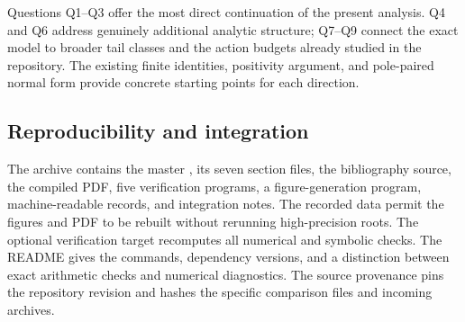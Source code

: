 Questions Q1--Q3 offer the most direct continuation of the present
analysis.  Q4 and Q6 address genuinely additional analytic structure;
Q7--Q9 connect the exact model to broader tail classes and the action
budgets already studied in the repository.  The existing finite
identities, positivity argument, and pole-paired normal form provide
concrete starting points for each direction.

\subsection{Reproducibility and integration}

The archive contains the master , its seven section
files, the bibliography source, the compiled PDF, five verification
programs, a figure-generation program, machine-readable records,
and integration notes.  The recorded data permit the figures and PDF
to be rebuilt without rerunning high-precision roots.  The optional
verification target recomputes all numerical and symbolic checks.
The README gives the commands, dependency versions, and a distinction
between exact arithmetic checks and numerical diagnostics.
The source provenance pins the repository revision and hashes the
specific comparison files and incoming archives.
